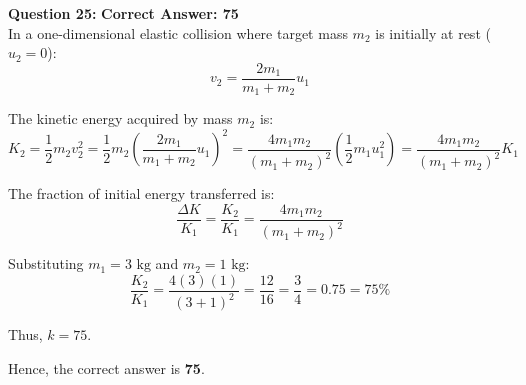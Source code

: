 \documentclass[11pt,a4paper]{article}
\begin{document}
\begin{tcolorbox}[solbox]
\textbf{\textcolor{primaryDark}{Question 25:}} \hfill \textbf{\textcolor{l1Green}{Correct Answer: 75}}\\
\vspace{4pt}
In a one-dimensional elastic collision where target mass $m_2$ is initially at rest ($u_2 = 0$):
$$v_2 = \frac{2m_1}{m_1 + m_2} u_1$$

The kinetic energy acquired by mass $m_2$ is:
$$K_2 = \frac{1}{2}m_2 v_2^2 = \frac{1}{2}m_2 \left(\frac{2m_1}{m_1 + m_2} u_1\right)^2 = \frac{4 m_1 m_2}{(m_1 + m_2)^2} \left(\frac{1}{2}m_1 u_1^2\right) = \frac{4 m_1 m_2}{(m_1 + m_2)^2} K_1$$

The fraction of initial energy transferred is:
$$\frac{\Delta K}{K_1} = \frac{K_2}{K_1} = \frac{4 m_1 m_2}{(m_1 + m_2)^2}$$

Substituting $m_1 = 3\text{ kg}$ and $m_2 = 1\text{ kg}$:
$$\frac{K_2}{K_1} = \frac{4(3)(1)}{(3 + 1)^2} = \frac{12}{16} = \frac{3}{4} = 0.75 = 75\%$$

Thus, $k = 75$.

Hence, the correct answer is \textbf{75}.
\end{tcolorbox}
\end{document}
